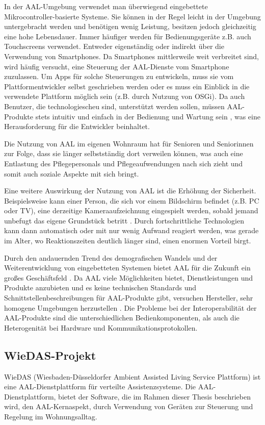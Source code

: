 In der AAL-Umgebung verwendet man überwiegend eingebettete Mikrocontroller-basierte Systeme.
Sie können in der Regel leicht in der Umgebung untergebracht werden und benötigen wenig Leistung, besitzen
jedoch gleichzeitig eine hohe Lebensdauer.
Immer häufiger werden für Bedienungsgeräte z.B. auch Touchscreens verwendet.
Entweder eigenständig oder indirekt über die Verwendung von Smartphones.
Da Smartphones mittlerweile weit verbreitet sind, wird häufig versucht, eine Steuerung der AAL-Dienste
vom Smartphone zuzulassen.
Um Apps für solche Steuerungen zu entwickeln, muss sie vom Plattformentwickler selbst geschrieben werden oder
es muss ein Einblick in die verwendete Plattform möglich sein (z.B. durch Nutzung von OSGi).
Da auch Benutzer, die technologiescheu sind, unterstützt werden sollen, müssen AAL-Produkte
stets intuitiv und einfach in der Bedienung und Wartung sein \cite{aaldeu}, was eine Herausforderung für
die Entwickler beinhaltet.

Die Nutzung von AAL im eigenen Wohnraum hat für Senioren und Seniorinnen zur Folge, dass sie
länger selbstständig dort verweilen können, was auch eine Entlastung des Pflegepersonals und
Pflegeaufwendungen nach sich zieht und somit auch soziale Aspekte mit sich bringt.

Eine weitere Auswirkung der Nutzung von AAL ist die Erhöhung der Sicherheit.
Beispielsweise kann einer Person, die sich vor einem Bildschirm befindet (z.B. PC oder TV),
eine derzeitige Kameraaufzeichnung eingespielt werden, sobald jemand unbefugt das
eigene Grundstück betritt \cite{crestron}.
Durch fortschrittliche Technologien kann dann automatisch oder mit nur wenig Aufwand reagiert werden,
was gerade im Alter, wo Reaktionszeiten deutlich länger sind, einen enormen Vorteil birgt.

Durch den andauernden Trend des demografischen Wandels und der Weiterentwicklung von eingebetteten
Systemen bietet AAL für die Zukunft ein großes Geschäftsfeld \cite{fhf_aal}.
Da AAL viele Möglichkeiten bietet, Dienstleistungen und Produkte anzubieten und es keine technischen Standards
und Schnittstellenbeschreibungen für AAL-Produkte gibt, versuchen Hersteller, sehr homogene Umgebungen
herzustellen \cite{aal_interop}.
Die Probleme bei der Interoperabilität der AAL-Produkte sind die unterschiedlichen Bedienkomponenten,
als auch die Heterogenität bei Hardware und Kommunikationsprotokollen.

\subsection{WieDAS-Projekt}
\label{gru_wiedas_projekt}
WieDAS (Wiesbaden-Düsseldorfer Ambient Assisted Living Service Plattform) ist eine AAL-Dienstplattform
für verteilte Assistenzsysteme.
Die AAL-Dienstplattform, bietet der Software, die im Rahmen dieser Thesis beschrieben wird, den AAL-Kernaspekt,
durch Verwendung von Geräten zur Steuerung und Regelung im Wohnungsalltag.

